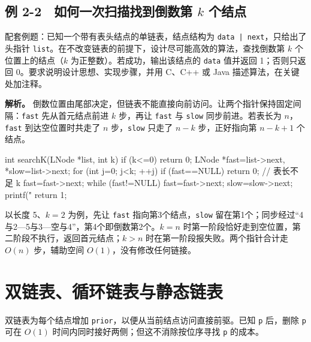 \subsection{\texorpdfstring{例 2-2　如何一次扫描找到倒数第 \(k\) 个结点}{例 2-2　如何一次扫描找到倒数第 k 个结点}}\label{DS02-ex2}

\begin{example}[配套例题]

配套例题：已知一个带有表头结点的单链表，结点结构为 \texttt{data | next}，只给出了头指针 \texttt{list}。在不改变链表的前提下，设计尽可能高效的算法，查找倒数第 \(k\) 个位置上的结点（\(k\) 为正整数）。若成功，输出该结点的 \texttt{data} 值并返回 1；否则只返回 0。要求说明设计思想、实现步骤，并用 C、C++ 或 Java 描述算法，在关键处加注释。

\end{example}

\textbf{解析。} 倒数位置由尾部决定，但链表不能直接向前访问。让两个指针保持固定间隔：\texttt{fast} 先从首元结点前进 \(k\) 步，再让 \texttt{fast} 与 \texttt{slow} 同步前进。若表长为 \(n\)，\texttt{fast} 到达空位置时共走了 \(n\) 步，\texttt{slow} 只走了 \(n-k\) 步，正好指向第 \(n-k+1\) 个结点。

\par\medskip\noindent\begin{minipage}{\linewidth}
\begin{codeblock}[language=C]
int searchK(LNode *list, int k) {
    if (k<=0) return 0;
    LNode *fast=list->next, *slow=list->next;
    for (int j=0; j<k; ++j) {
        if (fast==NULL) return 0;   // 表长不足 k
        fast=fast->next;
    }
    while (fast!=NULL) {
        fast=fast->next;
        slow=slow->next;
    }
    printf("%
    return 1;
}
\end{codeblock}
\end{minipage}\par\medskip

以长度 5、\(k=2\) 为例，先让 \texttt{fast} 指向第3个结点，\texttt{slow} 留在第1个；同步经过``4与2---5与3---空与4''，第4个即倒数第2个。\(k=n\) 时第一阶段恰好走到空位置，第二阶段不执行，返回首元结点；\(k>n\) 时在第一阶段报失败。两个指针合计走 \(O(n)\) 步，辅助空间 \(O(1)\)，没有修改任何链接。

\section{双链表、循环链表与静态链表}\label{DS02-04}

双链表为每个结点增加 \texttt{prior}，以便从当前结点访问直接前驱。已知 \texttt{p} 后，删除 \texttt{p} 可在 \(O(1)\) 时间内同时接好两侧；但这不消除按位序寻找 \texttt{p} 的成本。

